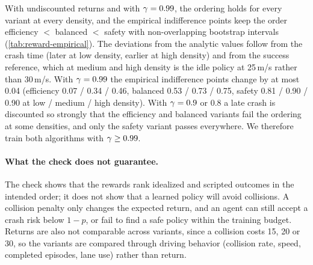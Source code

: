 With undiscounted returns and with $\gamma = 0.99$, the ordering holds for every variant at every density, and the
empirical indifference points keep the order efficiency $<$ balanced $<$ safety with non-overlapping bootstrap
intervals (\cref{tab:reward-empirical}). The deviations from the analytic values follow from the crash time (later at
low density, earlier at high density) and from the success reference, which at medium and high density is the idle
policy at 25\,m/s rather than 30\,m/s. With $\gamma = 0.99$ the empirical indifference points change by at most 0.04
(efficiency 0.07 / 0.34 / 0.46, balanced 0.53 / 0.73 / 0.75, safety 0.81 / 0.90 / 0.90 at low / medium / high
density). With $\gamma = 0.9$ or $0.8$ a late crash is discounted so strongly that the
efficiency and balanced variants fail the ordering at some densities, and only the safety variant passes everywhere.
We therefore train both algorithms with $\gamma \geq 0.99$.

\paragraph{What the check does not guarantee.}
The check shows that the rewards rank idealized and scripted outcomes in the intended order; it does not show that a
learned policy will avoid collisions. A collision penalty only changes the expected return, and an agent can still
accept a crash risk below $1-p$, or fail to find a safe policy within the training budget. Returns are also not
comparable across variants, since a collision costs 15, 20 or 30, so the variants are compared through driving
behavior (collision rate, speed, completed episodes, lane use) rather than return.
